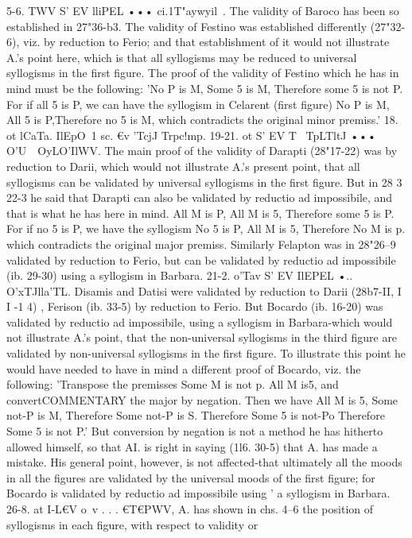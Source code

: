 {5-6. TWV S' EV lliPEL ••• ci.1T"aywyil~. The validity of Baroco
has been so established in 27"36-b3. The validity of Festino was
established differently (27"32-6), viz. by reduction to Ferio; and
that establishment of it would not illustrate A.'s point here,
which is that all syllogisms may be reduced to universal syllogisms
in the first figure. The proof of the validity of Festino which he
has in mind must be the following: 'No P is M, Some 5 is M,
Therefore some 5 is not P. For if all 5 is P, we can have the
syllogism in Celarent (first figure) No P is M, All 5 is P,Therefore
no 5 is M, which contradicts the original minor premiss.'
18. ot lCaTa. IlEpO~1 sc. €v 'TcjJ Trpc!mp.
19-21. ot S' EV T~ TpLTltJ ••• O'U~~OyLO'IlWV. The main proof of
the validity of Darapti (28"17-22) was by reduction to Darii,
which would not illustrate A.'s present point, that all syllogisms
can be validated by universal syllogisms in the first figure. But
in 28 3 22-3 he said that Darapti can also be validated by reductio
ad impossibile, and that is what he has here in mind. All M is P,
All M is 5, Therefore some 5 is P. For if no 5 is P, we have the
syllogism No 5 is P, All M is 5, Therefore No M is p. which
contradicts the original major premiss.
Similarly Felapton was in 28"26--9 validated by reduction to
Ferio, but can be validated by reductio ad impossibile (ib. 29-30)
using a syllogism in Barbara.
21-2. o'Tav S' EV IlEPEL •.. O'xTJlla'TL. Disamis and Datisi were
validated by reduction to Darii (28b7-II, I I -1 4) , Ferison (ib.
33-5) by reduction to Ferio. But Bocardo (ib. 16-20) was validated
by reductio ad impossibile, using a syllogism in Barbara-which
would not illustrate A.'s point, that the non-universal syllogisms
in the third figure are validated by non-universal syllogisms in the
first figure. To illustrate this point he would have needed to
have in mind a different proof of Bocardo, viz. the following:
'Transpose the premisses Some M is not p. All M is5, and convertCOMMENTARY
the major by negation. Then we have All M is 5, Some not-P
is M, Therefore Some not-P is S. Therefore Some 5 is not-Po
Therefore Some 5 is not P.' But conversion by negation is not
a method he has hitherto allowed himself, so that AI. is right in
saying (1l6. 30-5) that A. has made a mistake. His general point,
however, is not affected-that ultimately all the moods in all
the figures are validated by the universal moods of the first
figure; for Bocardo is validated by reductio ad impossibile using
'
a syllogism in Barbara.
26-8. at I-L€V o~v . . . €T€PWV, A. has shown in chs. 4--6 the
position of syllogisms in each figure, with respect to validity or
}
